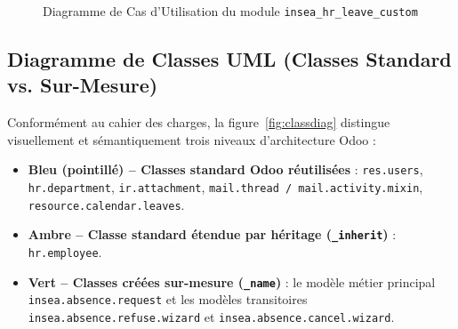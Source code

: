 \documentclass[11pt,a4paper]{article}
\begin{document}
\begin{figure}[H]
\caption{Diagramme de Cas d'Utilisation du module \texttt{insea\_hr\_leave\_custom}}
\label{fig:usecase}
\end{figure}

\subsection{Diagramme de Classes UML (Classes Standard vs. Sur-Mesure)}
Conformément au cahier des charges, la figure~\ref{fig:classdiag} distingue visuellement et sémantiquement trois niveaux d'architecture Odoo :
\begin{itemize}[itemsep=1pt]
    \item \textbf{\color{stdBorder} Bleu (pointillé) -- Classes standard Odoo réutilisées} : \texttt{res.users}, \texttt{hr.department}, \texttt{ir.attachment}, \texttt{mail.thread / mail.activity.mixin}, \texttt{resource.calendar.leaves}.
    \item \textbf{\color{extBorder} Ambre -- Classe standard étendue par héritage (\texttt{\_inherit})} : \texttt{hr.employee}.
    \item \textbf{\color{customBorder} Vert -- Classes créées sur-mesure (\texttt{\_name})} : le modèle métier principal \texttt{insea.absence.request} et les modèles transitoires \texttt{insea.absence.refuse.wizard} et \texttt{insea.absence.cancel.wizard}.
\end{itemize}
\end{document}
